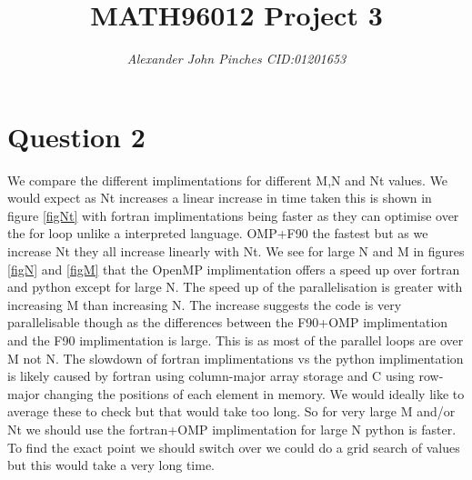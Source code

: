 \documentclass{article}
\title{MATH96012 Project 3}
\author{\emph{Alexander John Pinches CID:01201653}}
\begin{document}
\maketitle



\section*{Question 2}
We compare the different implimentations for different M,N and Nt values.
We would expect as Nt increases a linear increase in time taken this is shown
in figure \ref{figNt} with fortran implimentations being faster as they can optimise over the for loop unlike a interpreted language. OMP+F90 the fastest but as we increase Nt they all increase linearly with Nt.
 We see for large N and M in figures \ref{figN} and 
\ref{figM} that the OpenMP implimentation offers a speed up over
fortran and python except for large N. The speed up of the parallelisation is greater with increasing M than increasing N. The increase suggests the code is very
parallelisable though as the differences between the F90+OMP implimentation and the F90 implimentation is large.
This is as most of the parallel loops are over M not N. The slowdown of fortran implimentations vs the python implimentation is likely caused by 
fortran using column-major array storage and C using row-major changing the positions of each element in memory. We would ideally like to average these to check but that would take too long. So for very large M and/or Nt we should use the fortran+OMP implimentation for large N python is faster. To find the
exact point we should switch over we could do a grid search of values but this would take a very long time. 
\end{document}
